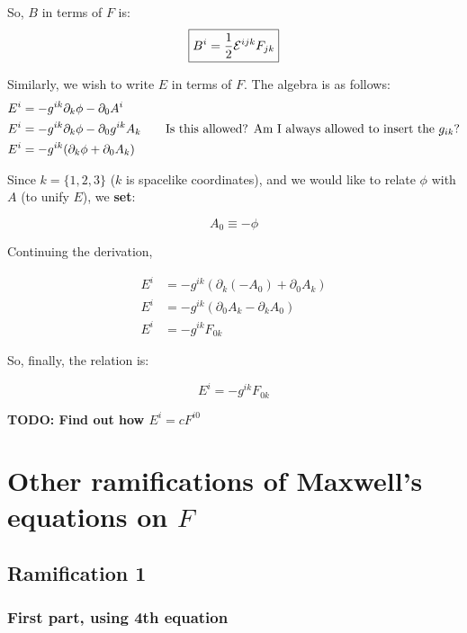 So, $B$ in terms of $F$ is:
\begin{equation}
    \boxed{B^i = \frac{1}{2} \mathcal{E}^{ijk} F_{jk}}
\end{equation}

Similarly, we wish to write $E$ in terms of $F$. The algebra is as follows:
\begin{align*}
    E^i &= -g^{ik} \partial_k \phi - \partial_0 A^i \\
    E^i &= -g^{ik} \partial_k \phi - \partial_0 g^{ik} A_k  \tag*{Is this allowed? Am I always allowed to insert the $g_{ik}$?} \\
    E^i &= -g^{ik} (\partial_k \phi + \partial_0 A_k) \\
\end{align*}

Since $k = \{1, 2, 3\}$ ($k$ is spacelike coordinates), and we would like to
relate $\phi$ with $A$ (to unify $E$), we \textbf{set}:

\begin{equation}
    \boxed{A_0 \equiv - \phi}
\end{equation}

Continuing the derivation,



\begin{align*}
    E^i &= -g^{ik} (\partial_k (- A_0) + \partial_0 A_k) \\
    E^i &= -g^{ik} (\partial_0 A_k - \partial_k A_0 ) \\
    E^i &= -g^{ik} F_{0k}
\end{align*}


So, finally, the relation is:

\begin{equation}
    \boxed{E^i = -g^{ik} F_{0k}}
\end{equation}

\textbf{TODO: Find out how $E^i = c F^{i0}$}

\section{Other ramifications of Maxwell's equations on $F$}

\subsection{Ramification 1}
\subsubsection{First part, using 4th equation}

